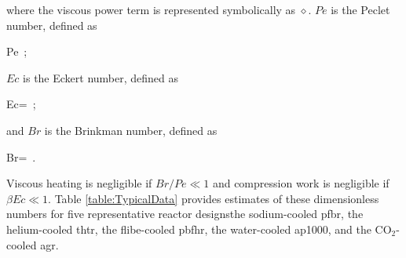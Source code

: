 \noindent where the viscous power term is represented symbolically as \(\diamond\). \(Pe\) is the Peclet number, defined as

\beq
\label{eq:PecletDef}
Pe\equiv{}\ ;
\eeq


\noindent\(Ec\) is the Eckert number, defined as

\beq
\label{eq:EcNumber}
Ec=\ ;
\eeq

\noindent and \(Br\) is the Brinkman number, defined as

\beq
\label{eq:BrNumber}
Br=\ .
\eeq

\noindent Viscous heating is negligible if \(Br/Pe\ll1\) and compression work is negligible if \(\beta Ec\ll1\). Table \ref{table:TypicalData} provides estimates of these dimensionless numbers for five representative reactor designs\mdash the sodium-cooled \gls{pfbr}, the helium-cooled \gls{thtr}, the \gls{flibe}-cooled \gls{pbfhr}, the water-cooled \gls{ap1000}, and the CO$_2$-cooled \gls{agr}. 

